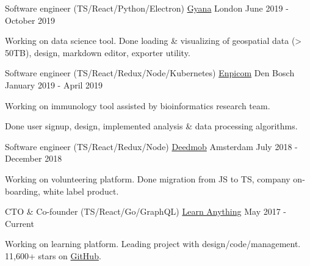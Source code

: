 
\begin{cventries}

  \cventry
    {Software engineer (TS/React/Python/Electron)}
    {\href{https://www.gyana.co.uk}{Gyana}}
    {London}
    {June 2019 - October 2019}
     {
      \begin{cvitems}
        \item {Working on data science tool. Done loading \& visualizing of geospatial data (> 50TB), design, markdown editor, exporter utility.}
      \end{cvitems}
    }

  \cventry
    {Software engineer (TS/React/Redux/Node/Kubernetes)}
    {\href{https://www.enpicom.com}{Enpicom}}
    {Den Bosch}
    {January 2019 - April 2019}
     {
      \begin{cvitems}
        \item {Working on immunology tool assisted by bioinformatics research team.}
        \item {Done user signup, design, implemented analysis \& data processing algorithms.}
      \end{cvitems}
    }

  \cventry
    {Software engineer (TS/React/Redux/Node)}
    {\href{https://www.deedmob.com}{Deedmob}}
    {Amsterdam}
    {July 2018 - December 2018}
     {
      \begin{cvitems}
        \item {Working on volunteering platform. Done migration from JS to TS, company on-boarding, white label product.}
      \end{cvitems}
    }

  \cventry
    {CTO \& Co-founder (TS/React/Go/GraphQL)}
    {\href{https://learn-anything.xyz}{Learn Anything}}
    {}
    {May 2017 - Current}
     {
      \begin{cvitems}
        \item {Working on learning platform. Leading project with design/code/management. 11,600+ stars on \href{https://github.com/learn-anything/learn-anything}{GitHub}.}
      \end{cvitems}
    }

\end{cventries}
